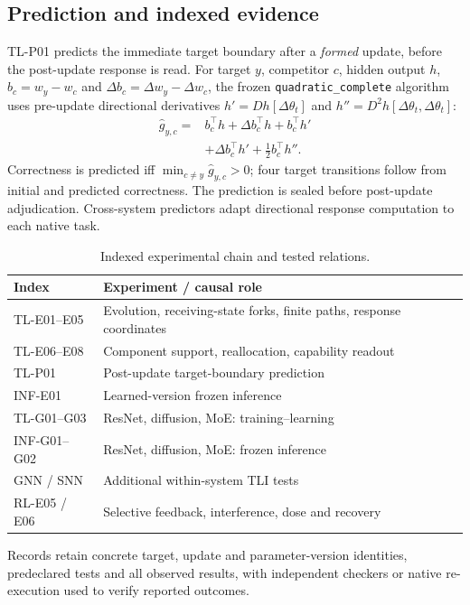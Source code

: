 \documentclass[conference,10pt]{IEEEtran}
\begin{document}
\subsection{Prediction and indexed evidence}
TL-P01 predicts the immediate target boundary after a \emph{formed} update, before the post-update response is read. For target $y$, competitor $c$, hidden output $h$, $b_c=w_y-w_c$ and $\Delta b_c=\Delta w_y-\Delta w_c$, the frozen \texttt{quadratic\_complete} algorithm uses pre-update directional derivatives $h'=Dh[\Delta\theta_t]$ and $h''=D^2h[\Delta\theta_t,\Delta\theta_t]$:
\begin{equation}
 \begin{aligned}
 \widehat g_{y,c}={}&b_c^\top h+\Delta b_c^\top h+b_c^\top h'\\
 &+\Delta b_c^\top h'+\tfrac12 b_c^\top h''.
 \end{aligned}
 \label{eq:predict}
\end{equation}
Correctness is predicted iff $\min_{c\ne y}\widehat g_{y,c}>0$; four target transitions follow from initial and predicted correctness. The prediction is sealed before post-update adjudication. Cross-system predictors adapt directional response computation to each native task.

\begin{table}[t]
\caption{Indexed experimental chain and tested relations.}
\label{tab:index}\centering\scriptsize\setlength{\tabcolsep}{3pt}\renewcommand{\arraystretch}{1.09}
\begin{tabular}{@{}p{}p{}@{}}\toprule
Index & Experiment / causal role\\\midrule
TL-E01--E05 & Evolution, receiving-state forks, finite paths, response coordinates\\
TL-E06--E08 & Component support, reallocation, capability readout\\
TL-P01 & Post-update target-boundary prediction\\
INF-E01 & Learned-version frozen inference\\
TL-G01--G03 & ResNet, diffusion, MoE: training--learning\\
INF-G01--G02 & ResNet, diffusion, MoE: frozen inference\\
GNN / SNN & Additional within-system TLI tests\\
RL-E05 / E06 & Selective feedback, interference, dose and recovery\\
\bottomrule\end{tabular}
\end{table}
Records retain concrete target, update and parameter-version identities, predeclared tests and all observed results, with independent checkers or native re-execution used to verify reported outcomes.
\end{document}
